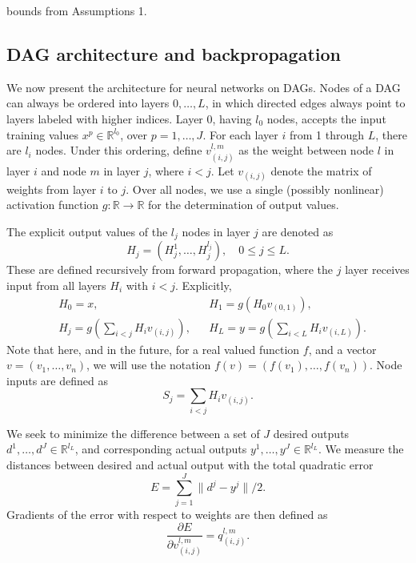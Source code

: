 \documentclass{jcmlatex}
\begin{document}
bounds from Assumptions 1.\subsection{DAG architecture and backpropagation}
We now present the architecture for neural networks on DAGs. Nodes of a  DAG can always be ordered into layers $0, \dots, L$, in which directed edges always point to layers labeled with higher indices.  Layer 0, having $l_0$ nodes,  accepts the input training values $x^p \in \mathbb R^{l_0}$, over $ p = 1, \dots, J$.  For each layer $i$  from 1 through $L$, there are $l_i$ nodes. Under this ordering, define $v_{(i,j)}^{l,m}$ as the weight between node $l$ in layer $i$ and node $m$ in layer $j$, where $i<j$. Let $v_{(i,j)}$ denote the matrix of weights from layer $i$ to $j$. Over all nodes, we use a single (possibly nonlinear) activation function $g:\mathbb R\rightarrow \mathbb R$  for the determination of output values. 

The explicit output values of the $l_j$ nodes in layer $j$ are denoted as
\begin{equation}
H_j = (H_j^1, \dots, H_j^{l_j}), \quad 0 \le j \le L.
\end{equation}
These are defined recursively from forward propagation, where the $j$ layer receives input from all layers $H_i$ with $i<j$. Explicitly,
\begin{align}
&H_0 = x,  &&H_1 = g\left(H_0 v_{(0,1)} \right),\\
&H_j = g\left(\sum_{i < j} H_iv_{(i,j)} \right),  &&H_L = y = g\left(\sum_{i <L } H_iv_{(i,L)} \right).\label{nodeeqn}
\end{align}  
 Note that here, and in the future, for
a real valued function $f$, and a vector $v= (v_1, \dots, v_n)$, we will use
the notation $f(v) = (f(v_1), \dots, f(v_n))$. Node inputs are defined as 
 \begin{equation}
 S_j= \sum_{i < j} H_iv_{(i,j)}.
 \end{equation}
 
We seek to minimize the difference between a set of  $J$ desired outputs $d^1, \dots, d^J \in \mathbb{R}^{l_L}$, and corresponding actual outputs  $y^1, \dots, y^J \in \mathbb{R}^{l_L}$. We measure the distances between desired and actual output with the total quadratic error
\begin{equation}
E = \sum_{j = 1}^J \|d^j-y^j\|/2. \label{generrordef}
\end{equation}
Gradients of the error with respect to weights are then defined as
\begin{equation}\label{defq}
\frac{\partial E}{\partial v_{(i,j)}^{l,m}} =  q_{(i,j)}^{l,m}.
\end{equation}
\end{document}
